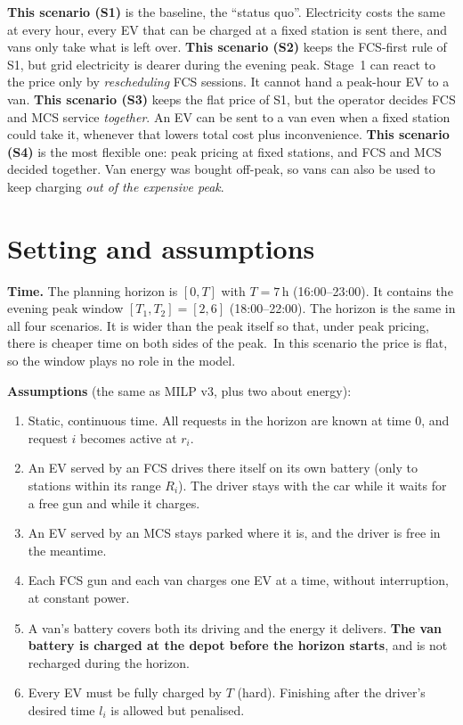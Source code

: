 \documentclass[11pt,a4paper]{article}
\newif\ifTOU \TOUfalse   %
\begin{document}
\ifnum{}
\textbf{This scenario (S1)} is the baseline, the ``status quo''. Electricity costs the same at every hour, every EV that can be charged at a fixed station is sent there, and vans only take what is left over.
\fi
\ifnum{}
\textbf{This scenario (S2)} keeps the FCS-first rule of S1, but grid electricity is dearer during the evening peak. Stage~1 can react to the price only by \emph{rescheduling} FCS sessions. It cannot hand a peak-hour EV to a van.
\fi
\ifnum{}
\textbf{This scenario (S3)} keeps the flat price of S1, but the operator decides FCS and MCS service \emph{together}. An EV can be sent to a van even when a fixed station could take it, whenever that lowers total cost plus inconvenience.
\fi
\ifnum{}
\textbf{This scenario (S4)} is the most flexible one: peak pricing at fixed stations, and FCS and MCS decided together. Van energy was bought off-peak, so vans can also be used to keep charging \emph{out of the expensive peak}.
\fi

\section{Setting and assumptions}\label{sec:setting}

\textbf{Time.} The planning horizon is $[0,T]$ with $T=7$\,h (16:00--23:00). It contains the evening peak window $[T_1,T_2]=[2,6]$ (18:00--22:00). The horizon is the same in all four scenarios. It is wider than the peak itself so that, under peak pricing, there is cheaper time on both sides of the peak.\ifTOU\else\ In this scenario the price is flat, so the window plays no role in the model.\fi

\textbf{Assumptions} (the same as MILP v3, plus two about energy):
\begin{enumerate}[leftmargin=1.6em,itemsep=1pt]
  \item Static, continuous time. All requests in the horizon are known at time $0$, and request $i$ becomes active at $r_i$.
  \item An EV served by an FCS drives there itself on its own battery (only to stations within its range $R_i$). The driver stays with the car while it waits for a free gun and while it charges.
  \item An EV served by an MCS stays parked where it is, and the driver is free in the meantime.
  \item Each FCS gun and each van charges one EV at a time, without interruption, at constant power.
  \item A van's battery covers both its driving and the energy it delivers. \textbf{The van battery is charged at the depot before the horizon starts}\ifTOU, i.e.\ at the off-peak price\fi, and is not recharged during the horizon.
  \item Every EV must be fully charged by $T$ (hard). Finishing after the driver's desired time $l_i$ is allowed but penalised.
\end{enumerate}
\end{document}
